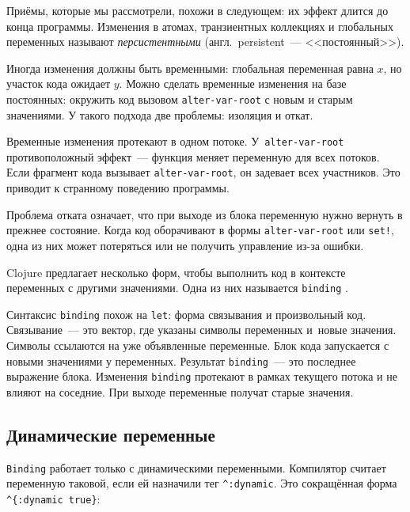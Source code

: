 Приёмы, которые мы рассмотрели, похожи в следующем: их эффект длится до конца
программы. Изменения в атомах, транзиентных коллекциях и глобальных переменных
называют \emph{персистентными} (англ.~persistent~--- <<постоянный>>).

Иногда изменения должны быть временными: глобальная переменная равна $x$, но
участок кода ожидает $y$. Можно сделать временные изменения на базе постоянных:
окружить код вызовом \verb|alter-var-root| с новым и старым значениями. У
такого подхода две проблемы: изоляция и откат.


Временные изменения протекают в одном потоке. У~\verb|alter-var-root|
противоположный эффект~--- функция меняет переменную для всех потоков. Если
фрагмент кода вызывает \verb|alter-var-root|, он задевает всех участников. Это
приводит к странному поведению программы.

Проблема отката означает, что при выходе из блока переменную нужно вернуть в прежнее
состояние. Когда код оборачивают в формы \verb|alter-var-root| или \verb|set!|, одна
из них может потеряться или не получить управление из-за ошибки.

Clojure предлагает несколько форм, чтобы выполнить код в контексте переменных с
другими значениями. Одна из них называется \verb|binding| .


Синтаксис \verb|binding| похож на \verb|let|: форма связывания и
произвольный код. Связывание~--- это вектор, где указаны символы переменных и~новые
значения. Символы ссылаются на уже объявленные переменные. Блок кода запускается
с новыми значениями у переменных. Результат \verb|binding|~--- это последнее
выражение блока. Изменения \verb|binding| протекают в рамках текущего потока и
не влияют на соседние. При выходе переменные получат старые значения.

\subsection{Динамические переменные}

\label{dynamic-vars}


\verb|Binding| работает только с динамическими переменными. Компилятор считает
переменную таковой, если ей назначили тег \verb|^:dynamic|. Это сокращённая
форма \verb|^{:dynamic true}|:

